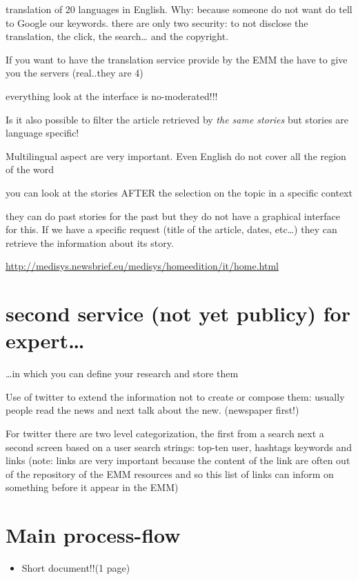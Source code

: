 \documentclass[]{book}
\providecommand{\tightlist}{%
  \setlength{\itemsep}{0pt}\setlength{\parskip}{0pt}}
\theoremstyle{definition}
\theoremstyle{definition}
\theoremstyle{definition}
\theoremstyle{remark}
\begin{document}
translation of 20 languages in English. Why: because someone do not want
do tell to Google our keywords. there are only two security: to not
disclose the translation, the click, the search\ldots{} and the
copyright.

If you want to have the translation service provide by the EMM the have
to give you the servers (real..they are 4)

everything look at the interface is no-moderated!!!

Is it also possible to filter the article retrieved by \emph{the same
stories} but stories are language specific!

Multilingual aspect are very important. Even English do not cover all
the region of the word

you can look at the stories AFTER the selection on the topic in a
specific context

they can do past stories for the past but they do not have a graphical
interface for this. If we have a specific request (title of the article,
dates, etc\ldots{}) they can retrieve the information about its story.

\url{http://medisys.newsbrief.eu/medisys/homeedition/it/home.html}

\section{second service (not yet publicy) for
expert\ldots{}}\label{second-service-not-yet-publicy-for-expert}

\ldots{}in which you can define your research and store them

Use of twitter to extend the information not to create or compose them:
usually people read the news and next talk about the new. (newspaper
first!)

For twitter there are two level categorization, the first from a search
next a second screen based on a user search strings: top-ten user,
hashtags keywords and links (note: links are very important because the
content of the link are often out of the repository of the EMM resources
and so this list of links can inform on something before it appear in
the EMM)

\section{Main process-flow}\label{main-process-flow}

\begin{itemize}
\tightlist
\item
  Short document!!(1 page)
\end{itemize}
\end{document}
